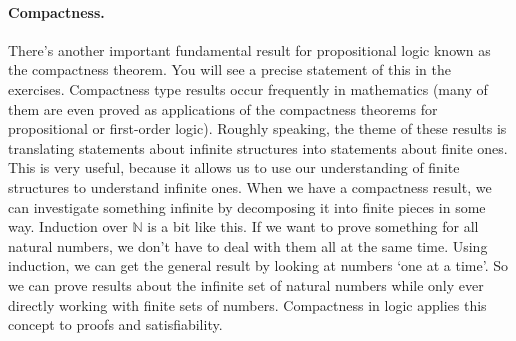 \documentclass{article}
\theoremstyle{plain}
\newcommand{\bN}{\mathbb{N}}
\begin{document}
\paragraph{Compactness.}
There's another important fundamental result for propositional logic known as the compactness theorem. You will see a precise statement of this in the exercises. Compactness type results occur frequently in mathematics (many of them are even proved as applications of the compactness theorems for propositional or first-order logic). Roughly speaking, the theme of these results is translating statements about infinite structures into statements about finite ones. This is very useful, because it allows us to use our understanding of finite structures to understand infinite ones. When we have a compactness result, we can investigate something infinite by decomposing it into finite pieces in some way. Induction over $\bN$ is a bit like this. If we want to prove something for all natural numbers, we don't have to deal with them all at the same time. Using induction, we can get the general result by looking at numbers `one at a time'. So we can prove results about the infinite set of natural numbers while only ever directly working with finite sets of numbers. Compactness in logic applies this concept to proofs and satisfiability.
\end{document}
